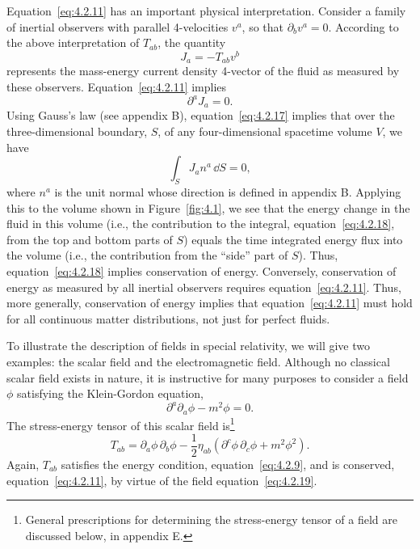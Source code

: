 Equation~\eqref{eq:4.2.11} has an important physical interpretation. Consider a
family of inertial observers with parallel 4-velocities \(v^a\), so that
\(\partial_bv^a=0\). According to the above interpretation of \(T_{ab}\), the
quantity
\begin{equation}
  J_a=-T_{ab}v^b
  \tag{4.2.16}\label{eq:4.2.16}
\end{equation}
represents the mass-energy current density 4-vector of the fluid as measured by
these observers. Equation~\eqref{eq:4.2.11} implies
\begin{equation}
  \partial^aJ_a=0 .
  \tag{4.2.17}\label{eq:4.2.17}
\end{equation}
Using Gauss's law (see appendix B), equation~\eqref{eq:4.2.17} implies that
over the three-dimensional boundary, \(S\), of any four-dimensional spacetime
volume \(V\), we have
\begin{equation}
  \int_S J_an^a\,\dd S=0 ,
  \tag{4.2.18}\label{eq:4.2.18}
\end{equation}
where \(n^a\) is the unit normal whose direction is defined in appendix B.
Applying this to the volume shown in Figure~\ref{fig:4.1}, we see that the energy
change in the fluid in this volume (i.e., the contribution to the integral,
equation~\eqref{eq:4.2.18}, from the top and bottom parts of \(S\)) equals
the time integrated energy flux into the volume (i.e., the contribution from the
\textquotedblleft side\textquotedblright{} part of \(S\)). Thus,
equation~\eqref{eq:4.2.18} implies conservation of energy. Conversely,
conservation of energy as measured by all inertial observers requires
equation~\eqref{eq:4.2.11}. Thus, more generally, conservation of energy implies
that equation~\eqref{eq:4.2.11} must hold for all continuous matter
distributions, not just for perfect fluids.



To illustrate the description of fields in special relativity, we will give two
examples: the scalar field and the electromagnetic field. Although no classical
scalar field exists in nature, it is instructive for many purposes to consider a field
\(\phi\) satisfying the Klein-Gordon equation,
\begin{equation}
  \partial^a\partial_a\phi-m^2\phi=0 .
  \tag{4.2.19}\label{eq:4.2.19}
\end{equation}
The stress-energy tensor of this scalar field is\footnote{General prescriptions for
determining the stress-energy tensor of a field are discussed below, in appendix E.}
\begin{equation}
  T_{ab}=\partial_a\phi\,\partial_b\phi
  -\frac12\eta_{ab}\left(\partial^c\phi\,\partial_c\phi+m^2\phi^2\right) .
  \tag{4.2.20}\label{eq:4.2.20}
\end{equation}
Again, \(T_{ab}\) satisfies the energy condition,
equation~\eqref{eq:4.2.9}, and is conserved,
equation~\eqref{eq:4.2.11}, by virtue of the field
equation~\eqref{eq:4.2.19}.

